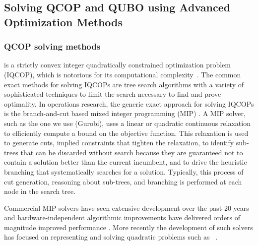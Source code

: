 \documentclass[preprint,12pt]{elsarticle}
\newcommand{\qcls}{{\sf {\small QC-LS\xspace}}}
\begin{document}
\subsection{Solving QCOP and QUBO using Advanced Optimization Methods}

\subsubsection{QCOP solving methods}
\label{quadratic}
\qcls{} is a strictly convex integer 
quadratically constrained optimization problem (IQCOP), which is notorious for its computational complexity~\cite{van1981another}.
The common exact methods for solving
IQCOPs are tree search \cite{land2010automatic} algorithms with a variety of sophisticated techniques to limit the search necessary to find and prove optimality.  In operations research, the generic exact approach for solving IQCOPs is the branch-and-cut based mixed integer programming (MIP) \cite{bonami2008algorithmic}. A MIP solver, such as the one we use (Gurobi), uses a linear or quadratic continuous relaxation to efficiently compute a bound on the objective function. This relaxation is used to generate cuts, implied constraints that tighten the relaxation, to identify sub-trees that can be discarded without search because they are guaranteed not to contain a solution better than the current incumbent, and to drive the heuristic branching that systematically searches for a solution. Typically, this process of cut generation, reasoning about sub-trees, and branching is performed at each node in the search tree.

Commercial MIP solvers have seen extensive development over the past 20 years and hardware-independent algorithmic improvements have delivered orders of magnitude improved performance \cite{Bixby07a}. More recently the development of such solvers has focused on representing and solving quadratic problems such as \qcls{}~\cite{Furini19a}.

\end{document}
